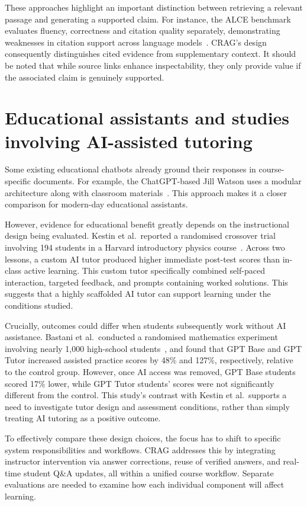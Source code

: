 These approaches highlight an important distinction between retrieving a relevant passage and generating a supported claim. For instance, the ALCE benchmark evaluates fluency, correctness and citation quality separately, demonstrating weaknesses in citation support across language models~\parencite{gao}. CRAG's design consequently distinguishes cited evidence from supplementary context. It should be noted that while source links enhance inspectability, they only provide value if the associated claim is genuinely supported.

\section{Educational assistants and studies involving AI-assisted tutoring}
Some existing educational chatbots already ground their responses in course-specific documents. For example, the ChatGPT-based Jill Watson uses a modular architecture along with classroom materials~\parencite{taneja}. This approach makes it a closer comparison for modern-day educational assistants.

However, evidence for educational benefit greatly depends on the instructional design being evaluated. Kestin et al.\ reported a randomised crossover trial involving 194 students in a Harvard introductory physics course~\parencite{kestin2025}. Across two lessons, a custom AI tutor produced higher immediate post-test scores than in-class active learning. This custom tutor specifically combined self-paced interaction, targeted feedback, and prompts containing worked solutions. This suggests that a highly scaffolded AI tutor can support learning under the conditions studied.

Crucially, outcomes could differ when students subsequently work without AI assistance. Bastani et al.\ conducted a randomised mathematics experiment involving nearly 1,000 high-school students~\parencite{bastani2025}, and found that GPT Base and GPT Tutor increased assisted practice scores by 48\% and 127\%, respectively, relative to the control group. However, once AI access was removed, GPT Base students scored 17\% lower, while GPT Tutor students' scores were not significantly different from the control. This study's contrast with Kestin et al.\ supports a need to investigate tutor design and assessment conditions, rather than simply treating AI tutoring as a positive outcome.

To effectively compare these design choices, the focus has to shift to specific system responsibilities and workflows. CRAG addresses this by integrating instructor intervention via answer corrections, reuse of verified answers, and real-time student Q\&A updates, all within a unified course workflow. Separate evaluations are needed to examine how each individual component will affect learning.

